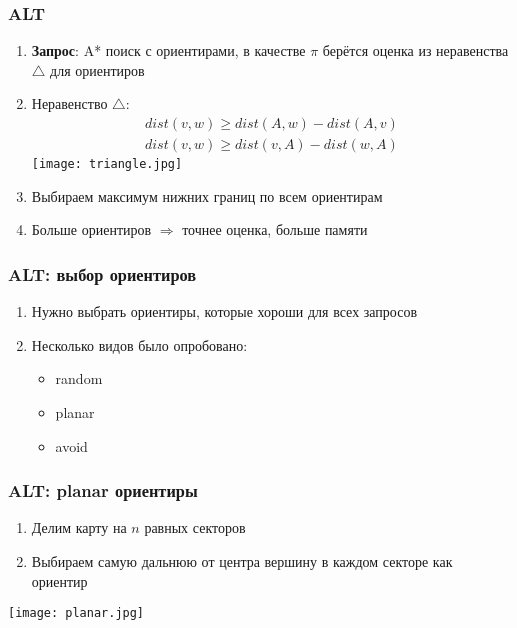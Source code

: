 \documentclass{beamer}
\begin{document}


\begin{frame}
\frametitle{ALT}
\begin{enumerate}	
\item \textbf{Запрос}: A* поиск с ориентирами, в качестве $\pi$ берётся оценка из неравенства $\triangle$ для ориентиров
\item Неравенство $\triangle \colon$
\begin{gather*}
	dist(v, w) \geq dist(A, w) - dist(A, v)\\
    dist(v, w) \geq dist(v, A) - dist(w, A)
\end{gather*}
\texttt{[image: triangle.jpg]}
\item Выбираем максимум нижних границ по всем ориентирам
\item Больше ориентиров $\Rightarrow$ точнее оценка, больше памяти
\end{enumerate}
\end{frame}


\begin{frame}
\frametitle{ALT: выбор ориентиров}
\begin{enumerate}	
\item Нужно выбрать ориентиры, которые хороши для всех запросов
\item Несколько видов было опробовано:
	\begin{itemize}
    \item random
    \item planar
    \item avoid
    \end{itemize}
\end{enumerate}
\end{frame}


\begin{frame}
\frametitle{ALT: planar ориентиры}
\begin{enumerate}	
\item Делим карту на $n$ равных секторов
\item Выбираем самую дальнюю от центра вершину в каждом секторе как ориентир
\end{enumerate}
\texttt{[image: planar.jpg]}
\end{frame}
\end{document}
